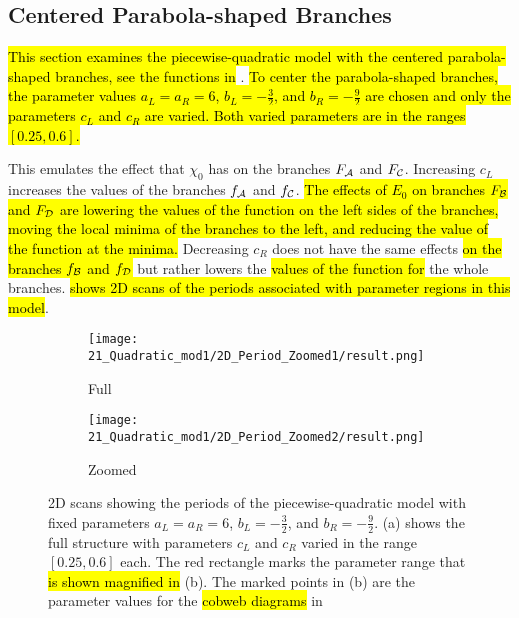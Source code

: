 \subsection{Centered Parabola-shaped Branches}
\label{sec:setup.quad.even}

\hl{This section examines the piecewise-quadratic model with the centered parabola-shaped branches, see the functions in} .
\hl{
	To center the parabola-shaped branches, the parameter values $a_L = a_R = 6$, $b_L = -\frac{3}{2}$, and $b_R = -\frac{9}{2}$ are chosen and only the parameters $c_L$ and $c_R$ are varied.
	Both varied parameters are in the ranges $[0.25, 0.6]$.
}


This emulates the effect that $\chi_0$ has on the branches $F_{\mathcal{A}}$ and $F_{\mathcal{C}}$.
Increasing $c_L$ increases the values of the branches $f_{\mathcal{A}}$ and $f_{\mathcal{C}}$.
\hl{
	The effects of $E_0$ on branches $F_{\mathcal{B}}$ and $F_{\mathcal{D}}$ are lowering the values of the function on the left sides of the branches, moving the local minima of the branches to the left, and reducing the value of the function at the minima.
}
Decreasing $c_R$ does not have the same effects \hl{on the branches $f_{\mathcal{B}}$ and $f_{\mathcal{D}}$} but rather lowers the \hl{values of the function for} the whole branches.
 \hl{shows 2D scans of the periods associated with parameter regions in this model}.

\begin{figure}
	\centering
	\begin{subfigure}{0.4\textwidth}
		\centering
		\texttt{[image: 21\_Quadratic\_mod1/2D\_Period\_Zoomed1/result.png]}
		\caption{Full}
		\label{fig:setup.quad.even.period.full}
	\end{subfigure}
	\begin{subfigure}{0.4\textwidth}
		\centering
		\texttt{[image: 21\_Quadratic\_mod1/2D\_Period\_Zoomed2/result.png]}
		\caption{Zoomed}
		\label{fig:setup.quad.even.period.zoomed}
	\end{subfigure}
	\caption[2D scans showing periods of the even piecewise quadratic model]{
		2D scans showing the periods of the piecewise-quadratic model with fixed parameters $a_L = a_R = 6$, $b_L = -\frac{3}{2}$, and $b_R = -\frac{9}{2}$.
		(a) shows the full structure with parameters $c_L$ and $c_R$ varied in the range $[0.25, 0.6]$ each.
		The red rectangle marks the parameter range that \hl{is shown magnified in} (b).
		The marked points in (b) are the parameter values for the \hl{cobweb diagrams} in 
	}
\end{figure}

